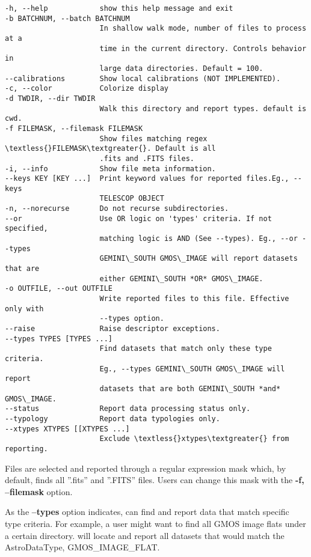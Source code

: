 \documentclass[letterpaper,10pt,english]{sphinxmanual}
\begin{document}
\begin{Verbatim}[commandchars=\\\{\}]
-h, --help            show this help message and exit
-b BATCHNUM, --batch BATCHNUM
                      In shallow walk mode, number of files to process at a
                      time in the current directory. Controls behavior in
                      large data directories. Default = 100.
--calibrations        Show local calibrations (NOT IMPLEMENTED).
-c, --color           Colorize display
-d TWDIR, --dir TWDIR
                      Walk this directory and report types. default is cwd.
-f FILEMASK, --filemask FILEMASK
                      Show files matching regex \textless{}FILEMASK\textgreater{}. Default is all
                      .fits and .FITS files.
-i, --info            Show file meta information.
--keys KEY [KEY ...]  Print keyword values for reported files.Eg., --keys
                      TELESCOP OBJECT
-n, --norecurse       Do not recurse subdirectories.
--or                  Use OR logic on 'types' criteria. If not specified,
                      matching logic is AND (See --types). Eg., --or --types
                      GEMINI\_SOUTH GMOS\_IMAGE will report datasets that are
                      either GEMINI\_SOUTH *OR* GMOS\_IMAGE.
-o OUTFILE, --out OUTFILE
                      Write reported files to this file. Effective only with
                      --types option.
--raise               Raise descriptor exceptions.
--types TYPES [TYPES ...]
                      Find datasets that match only these type criteria.
                      Eg., --types GEMINI\_SOUTH GMOS\_IMAGE will report
                      datasets that are both GEMINI\_SOUTH *and* GMOS\_IMAGE.
--status              Report data processing status only.
--typology            Report data typologies only.
--xtypes XTYPES [[XTYPES ...]
                      Exclude \textless{}xtypes\textgreater{} from reporting.
\end{Verbatim}

Files are selected and reported through a regular expression mask which,
by default, finds all ''.fits'' and ''.FITS'' files. Users can change this mask
with the \textbf{-f, --filemask} option.

As the \textbf{--types} option indicates,  can find and report data that
match specific type criteria. For example, a user might want to find all GMOS
image flats under a certain directory.  will locate and report all
datasets that would match the AstroDataType, GMOS\_IMAGE\_FLAT.
\end{document}
